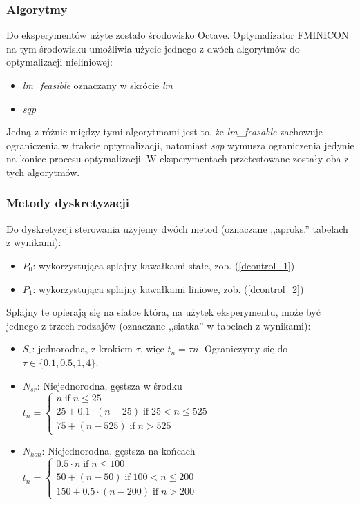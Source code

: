 \documentclass[11pt]{article}
\def\iif{\operatorname{if}}
\begin{document}
\subsubsection{Algorytmy}
Do eksperymentów użyte zostało środowisko Octave. Optymalizator FMINICON na tym środowisku umożliwia użycie jednego z dwóch algorytmów do optymalizacji nieliniowej:
\begin{itemize}
\item{\it lm\_feasible\/} oznaczany w skrócie {\it lm\/}
\item{\it sqp\/}
\end{itemize}
Jedną z różnic między tymi algorytmami jest to, że {\it lm\_feasable\/} zachowuje ograniczenia w trakcie optymalizacji, natomiast {\it sqp\/} wymusza ograniczenia jedynie na koniec procesu optymalizacji. W eksperymentach przetestowane zostały oba z tych algorytmów.
\subsubsection{Metody dyskretyzacji}
Do dyskretyzcji sterowania użyjemy dwóch metod (oznaczane ,,aproks.'' tabelach z wynikami):
\begin{itemize}
\item{$P_0$:} wykorzystująca splajny kawałkami stałe, zob. (\ref{dcontrol_1})
\item{$P_1$:} wykorzystująca splajny kawałkami liniowe, zob. (\ref{dcontrol_2})
\end{itemize}
Splajny te opierają się na siatce która, na użytek eksperymentu, może być jednego z trzech rodzajów (oznaczane ,,siatka'' w tabelach z wynikami):
\begin{itemize}
\item{$S_{\tau}$:} jednorodna, z krokiem $\tau$, więc $t_n = \tau n$. Ograniczymy się do $\tau \in \{0.1, 0.5, 1, 4\}$.
\item{$N_{sr}$: Niejednorodna, gęstsza w środku} $t_n = \begin{cases}
    n \iif n \le 25 \\
    25 + 0.1\cdot(n-25) \iif 25 < n \le 525 \\
    75 + (n - 525) \iif n > 525
  \end{cases}$
\item{$N_{kon}$: Niejednorodna, gęstsza na końcach} $t_n = \begin{cases}
    0.5\cdot n \iif n \le 100 \\
    50 + (n - 50) \iif 100 < n \le 200 \\
    150 + 0.5\cdot (n - 200) \iif n > 200
  \end{cases}$
\end{itemize}
\end{document}
